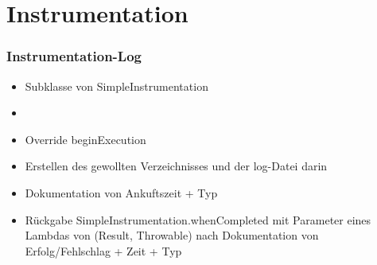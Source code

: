 \section*{Instrumentation}

\begin{frame}\frametitle{Instrumentation-Log}
    \begin{itemize} 
        \item Subklasse von \dq SimpleInstrumentation\dq{}
        \item \item Override \dq beginExecution\dq{} 
        \item Erstellen des gewollten Verzeichnisses und der log-Datei darin
        \item Dokumentation von Ankuftszeit + Typ
        \item Rückgabe SimpleInstrumentation.whenCompleted mit Parameter eines Lambdas 
              von \dq (Result, Throwable)\dq{} nach Dokumentation von Erfolg/Fehlschlag + Zeit + Typ
    \end{itemize}
\end{frame}